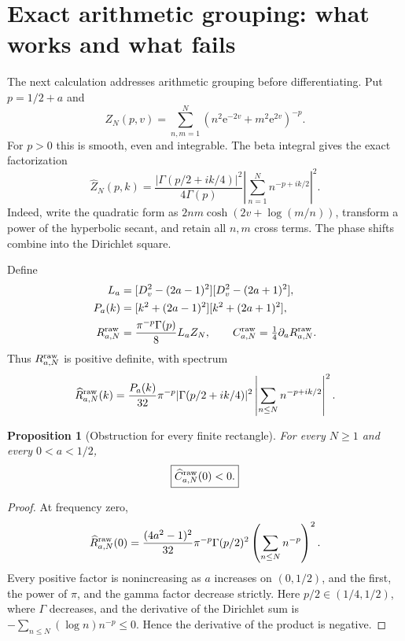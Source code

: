 \documentclass[11pt,letterpaper]{article}
\numberwithin{equation}{section}
\newtheorem{proposition}[theorem]{Proposition}
\theoremstyle{remark}\newtheorem{remark}[theorem]{Remark}
\newcommand{\ee}{\mathrm e}
\begin{document}
\section{Exact arithmetic grouping: what works and what fails}
The next calculation addresses arithmetic grouping before differentiating. Put $p=1/2+a$ and
\begin{equation}
Z_N(p,v)=\sum_{n,m=1}^N(n^2\ee^{-2v}+m^2\ee^{2v})^{-p}.
\end{equation}
For $p>0$ this is smooth, even and integrable. The beta integral \cite{dlmfBeta} gives the exact factorization
\begin{equation}\label{eq:rectfactor}
\boxed{\widehat Z_N(p,k)=
\frac{|\Gamma(p/2+ik/4)|^2}{4\Gamma(p)}
\left|\sum_{n=1}^N n^{-p+ik/2}\right|^2.}
\end{equation}
Indeed, write the quadratic form as $2nm\cosh(2v+\log(m/n))$, transform a power of the hyperbolic secant, and retain all $n,m$ cross terms. The phase shifts combine into the Dirichlet square.

Define
\begin{align}
L_a&=[D_v^2-(2a-1)^2][D_v^2-(2a+1)^2],\\
P_a(k)&=[k^2+(2a-1)^2][k^2+(2a+1)^2],\\
R^{\rm raw}_{a,N}&=\frac{\pi^{-p}\Gamma(p)}8 L_aZ_N,
\qquad C^{\rm raw}_{a,N}=\tfrac14\partial_aR^{\rm raw}_{a,N}.
\end{align}
Thus $R^{\rm raw}_{a,N}$ is positive definite, with spectrum
\begin{equation}
\widehat R^{\rm raw}_{a,N}(k)=\frac{P_a(k)}{32}\pi^{-p}
|\Gamma(p/2+ik/4)|^2\left|\sum_{n\le N}n^{-p+ik/2}\right|^2.
\end{equation}

\begin{proposition}[Obstruction for every finite rectangle]\label{prop:rawfail}
For every $N\ge1$ and every $0<a<1/2$,
\begin{equation}\label{eq:rawfail}
\boxed{\widehat C^{\rm raw}_{a,N}(0)<0.}
\end{equation}
\end{proposition}
\begin{proof}
At frequency zero,
\[
\widehat R^{\rm raw}_{a,N}(0)=
\frac{(4a^2-1)^2}{32}\pi^{-p}\Gamma(p/2)^2
\left(\sum_{n\le N}n^{-p}\right)^2.
\]
Every positive factor is nonincreasing as $a$ increases on $(0,1/2)$, and the first, the power of $\pi$, and the gamma factor decrease strictly. Here $p/2\in(1/4,1/2)$, where $\Gamma$ decreases, and the derivative of the Dirichlet sum is $-\sum_{n\le N}(\log n)n^{-p}\le0$. Hence the derivative of the product is negative.
\end{proof}
\end{document}
